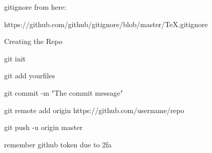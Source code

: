 \documentclass{article}
\begin{document}
gitignore from here:

https://github.com/github/gitignore/blob/master/TeX.gitignore

Creating the Repo

git init

git add yourfiles

git commit -m "The commit message"

git remote add origin https://github.com/username/repo

git push -u origin master

remember github token due to 2fa
\end{document}
